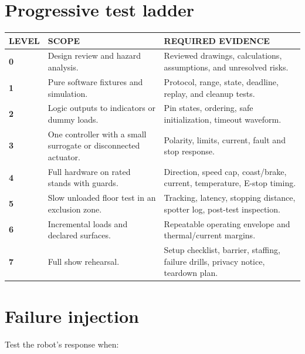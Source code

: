 \documentclass[10pt,openany]{book}
\begin{document}
\section{Progressive test ladder}

\begin{tabularx}{\textwidth}{>{\robcondensed\bfseries\color{ROBAccent}}p{0.6in} X X}
\toprule
LEVEL & SCOPE & REQUIRED EVIDENCE\\
\midrule
0 & Design review and hazard analysis. & Reviewed drawings, calculations, assumptions, and unresolved risks.\\
1 & Pure software fixtures and simulation. & Protocol, range, state, deadline, replay, and cleanup tests.\\
2 & Logic outputs to indicators or dummy loads. & Pin states, ordering, safe initialization, timeout waveform.\\
3 & One controller with a small surrogate or disconnected actuator. & Polarity, limits, current, fault and stop response.\\
4 & Full hardware on rated stands with guards. & Direction, speed cap, coast/brake, current, temperature, E-stop timing.\\
5 & Slow unloaded floor test in an exclusion zone. & Tracking, latency, stopping distance, spotter log, post-test inspection.\\
6 & Incremental loads and declared surfaces. & Repeatable operating envelope and thermal/current margins.\\
7 & Full show rehearsal. & Setup checklist, barrier, staffing, failure drills, privacy notice, teardown plan.\\
\bottomrule
\end{tabularx}

\section{Failure injection}

Test the robot's response when:
\end{document}
